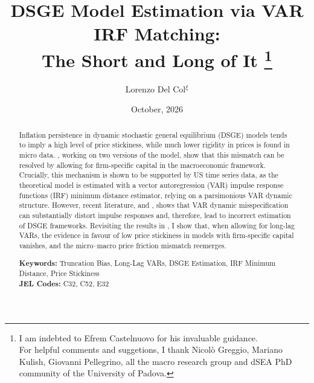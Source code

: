 \documentclass[12pt, a4paper]{article}
\begin{document}
\title{DSGE Model Estimation via VAR IRF Matching: \\ The Short and Long of It
\thanks{I am indebted to Efrem Castelnuovo for his invaluable guidance.
        \\
        For helpful comments and suggetions, I thank Nicolò Greggio, Mariano Kulish, Giovanni Pellegrino, all the macro 
        research group and dSEA PhD community of the University of Padova.}}
\author{Lorenzo Del Col$^{\xi}$}
\date{October, 2026}

\maketitle
\thispagestyle{empty}

{\renewcommand{\thefootnote}{\ensuremath{\xi}}%
}

\begin{abstract}
\noindent
        Inflation persistence in dynamic stochastic general equilibrium (DSGE) models tends to imply a
        high level of price stickiness, while much lower rigidity in prices is found in micro data.
        \citet{ACEL2011}, working on two versions of the \citet{CEE2005} model, show that this mismatch
        can be resolved by allowing for firm-specific capital in the macroeconomic framework. Crucially,
        this mechanism is shown to be supported by US time series data, as the theoretical model is
        estimated with a vector autoregression (VAR) impulse response functions (IRF) minimum distance estimator,
        relying on a parsimonious VAR dynamic structure. However, recent literature, \citet{Long_Lag2025}
        and \citet{Baumeister2025}, shows that VAR dynamic misspecification can substantially distort
        impulse responses and, therefore, lead to incorrect estimation of DSGE frameworks. Revisiting the
        results in \citet{ACEL2011}, I show that, when allowing for long-lag VARs, the evidence in favour
        of low price stickiness in models with firm-specific capital vanishes, and the micro--macro price
        friction mismatch reemerges.

    \vspace{0.3cm}
    \noindent\textbf{Keywords:} Truncation Bias, Long-Lag VARs, DSGE Estimation, IRF Minimum Distance, Price Stickiness
    \\
    \noindent\textbf{JEL Codes:} C32, C52, E32
\end{abstract}
\end{document}
